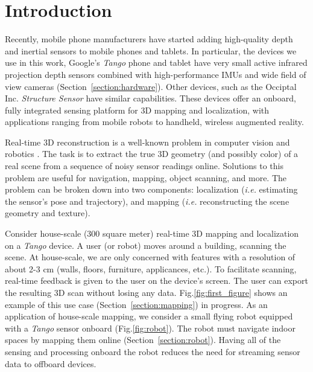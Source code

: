 \documentclass[conference]{IEEEtran}
\newcommand{\sref}[1]{Section~\ref{#1}}
\newcommand{\figref}[1]{Fig.\ref{#1}}
\newcommand{\ie}{\textit{i.e.}\xspace}
\newcommand{\Tango}{\textit{Tango}\xspace}
\begin{document}
\section{Introduction}
Recently, mobile phone manufacturers have started adding
high-quality depth and  inertial sensors to mobile phones and tablets. In
particular, the devices we use in this work, Google's \Tango \cite{Tango}
phone and tablet have very small active infrared projection depth sensors
combined with high-performance IMUs and wide field of view cameras
(\sref{section:hardware}). Other devices, such as the Occiptal Inc.
\textit{Structure Sensor} \cite{StructureSensor} have similar capabilities.
These devices offer an onboard, fully integrated sensing platform for 3D mapping
and localization, with applications ranging from mobile robots to handheld,
wireless augmented reality. 

Real-time 3D reconstruction is a well-known problem in computer vision and
robotics \cite{Hartley2004}. The task is to extract the true 3D geometry (and
possibly color) of a real scene from a sequence of noisy sensor readings online.
Solutions to this problem are useful for navigation, mapping, object scanning,
and more. The problem can be broken down into two components: localization (\ie
estimating the sensor's pose and trajectory), and mapping (\ie reconstructing
the scene geometry and texture).

Consider house-scale (300 square meter) real-time 3D mapping and localization on
a \Tango device.  A user (or robot) moves around a building, scanning
the scene. At house-scale, we are only concerned with features with a resolution
of about 2-3 cm (walls, floors, furniture, applicances, etc.). To facilitate
scanning, real-time feedback is given to the user on the device's screen.  The
user can export the resulting 3D scan without losing any data.
\figref{fig:first_figure} shows an example of this use case (\sref{section:mapping})
in progress. As an application of house-scale mapping, we consider a small
flying robot equipped with a \Tango sensor onboard (\figref{fig:robot}). The
robot must navigate indoor spaces by mapping them online (\sref{section:robot}).
Having all of the sensing and processing onboard the robot reduces the need for
streaming sensor data to offboard devices.
\end{document}
